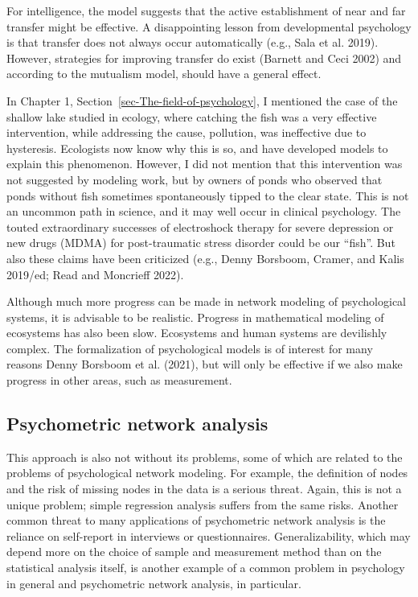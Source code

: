 \documentclass[
  a4paper,
  DIV=11,
  numbers=noendperiod,
  oneside]{scrreprt}
\begin{document}
For intelligence, the model suggests that the active establishment of
near and far transfer might be effective. A disappointing lesson from
developmental psychology is that transfer does not always occur
automatically (e.g., Sala et al. 2019). However, strategies for
improving transfer do exist (Barnett and Ceci 2002) and according to the
mutualism model, should have a general effect.

In Chapter 1, Section~\ref{sec-The-field-of-psychology}, I mentioned the
case of the shallow lake studied in ecology, where catching the fish was
a very effective intervention, while addressing the cause, pollution,
was ineffective due to hysteresis. Ecologists now know why this is so,
and have developed models to explain this phenomenon. However, I did not
mention that this intervention was not suggested by modeling work, but
by owners of ponds who observed that ponds without fish sometimes
spontaneously tipped to the clear state. This is not an uncommon path in
science, and it may well occur in clinical psychology. The touted
extraordinary successes of electroshock therapy for severe depression or
new drugs (MDMA) for post-traumatic stress disorder could be our
``fish''. But also these claims have been criticized (e.g., Denny
Borsboom, Cramer, and Kalis 2019/ed; Read and Moncrieff 2022).

Although much more progress can be made in network modeling of
psychological systems, it is advisable to be realistic. Progress in
mathematical modeling of ecosystems has also been slow. Ecosystems and
human systems are devilishly complex. The formalization of psychological
models is of interest for many reasons Denny Borsboom et al. (2021), but
will only be effective if we also make progress in other areas, such as
measurement.

\hypertarget{sec-Psychometric-network-analysis}{%
\subsection{Psychometric network
analysis}\label{sec-Psychometric-network-analysis}}

This approach is also not without its problems, some of which are
related to the problems of psychological network modeling. For example,
the definition of nodes and the risk of missing nodes in the data is a
serious threat. Again, this is not a unique problem; simple regression
analysis suffers from the same risks. Another common threat to many
applications of psychometric network analysis is the reliance on
self-report in interviews or questionnaires. Generalizability, which may
depend more on the choice of sample and measurement method than on the
statistical analysis itself, is another example of a common problem in
psychology in general and psychometric network analysis, in particular.
\end{document}
